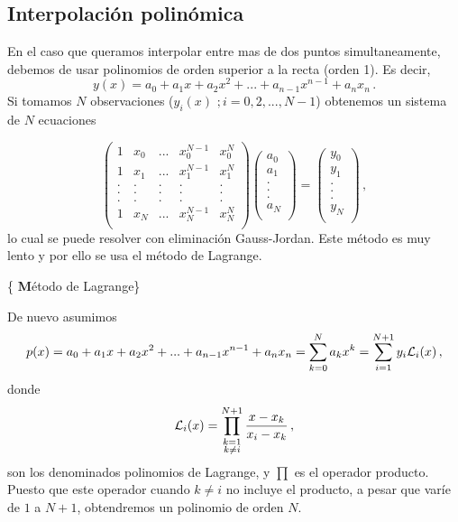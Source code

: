 \documentclass[
]{agujournal2019}
\begin{document}
\hypertarget{interpolaciuxf3n-polinuxf3mica}{%
\subsection{Interpolación
polinómica}\label{interpolaciuxf3n-polinuxf3mica}}

En el caso que queramos interpolar entre mas de dos puntos
simultaneamente, debemos de usar polinomios de orden superior a la recta
(orden 1). Es decir,
\[y(x)=a_0 + a_1 x + a_2 x^2 + ... + a_{n-1}x^{n-1} + a_n x_n\,.\] Si
tomamos \(N\) observaciones (\(y_i(x)\,\,;i=0,2,...,N-1\)) obtenemos un
sistema de \(N\) ecuaciones

\[\left(\begin{array}{ccccc}
  1 & x_0 & ... & x_0^{N-1} & x_0^N\\
  1 & x_1 & ... & x_1^{N-1} & x_1^N\\
  . & . & . & . & .\\
  . & . & . & . & .\\
  . & . & . & . & .\\
  1 & x_N & ... & x_N^{N-1} & x_N^N\\
     \end{array}\right)
    \left(\begin{array}{c}
  a_0 \\
  a_1 \\
  . \\
  . \\
  . \\
  a_N \\
     \end{array}\right)=
     \left(\begin{array}{c}
  y_0 \\
  y_1 \\
  . \\
  . \\
  . \\
  y_N \\
     \end{array}\right)\,,\] lo cual se puede resolver con eliminación
Gauss-Jordan. Este método es muy lento y por ello se usa el método de
Lagrange.

\vspace{0.5cm}

\{ \textbf Método de Lagrange\}

De nuevo asumimos
\[p(x)=a_0 + a_1 x + a_2 x^2 + ... + a_{n-1}x^{n-1} + a_n x_n=\sum\limits^{N}_{k=0} a_k x^k
=\sum^{N+1}_{i=1} y_i {\cal L}_i(x)\,,\] donde
\[{\cal L}_i(x)=\prod^{N+1}_{\substack{k=1\\ k\ne i}} \frac{x-x_k}{x_i-x_k}\,,\]
son los denominados polinomios de Lagrange, y \(\prod\) es el operador
producto. Puesto que este operador cuando \(k\ne i\) no incluye el
producto, a pesar que varíe de \(1\) a \(N+1\), obtendremos un polinomio
de orden \(N\).
\end{document}
